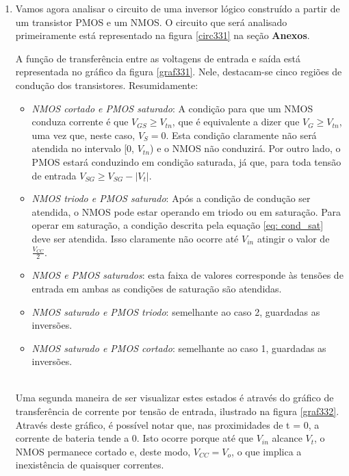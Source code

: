 \documentclass[12pt, a4paper]{article}
\begin{document}
\begin{enumerate}
    \item Vamos agora analisar o circuito de uma inversor lógico construído a partir de um transistor PMOS e um NMOS. O circuito que será analisado primeiramente está representado na figura \ref{circ331} na seção \textbf{Anexos}.
    
    A função de transferência entre as voltagens de entrada e saída está representada no gráfico da figura \ref{graf331}. Nele, destacam-se cinco regiões de condução dos transistores. Resumidamente:
    
        \begin{itemize}
            
            \item \textit{NMOS cortado e PMOS saturado}: A condição para que um NMOS conduza corrente é que \(V_{GS} \geq V_{tn} \), que é equivalente a dizer que \(V_{G} \geq V_{tn} \), uma vez que, neste caso, \(V_S = 0\). Esta condição claramente não será atendida no intervalo [0, \(V_{tn}\)) e o NMOS não conduzirá. Por outro lado, o PMOS estará conduzindo em condição saturada, já que, para toda tensão de entrada \(V_{SG} \geq V_{SG} - |V_t|\).
            
            \item \textit{NMOS triodo e PMOS saturado}: Após a condição de condução ser atendida, o NMOS pode estar operando em triodo ou em saturação. Para operar em saturação, a condição descrita pela equação \ref{eq: cond_sat} deve ser atendida. Isso claramente não ocorre até \(V_{in}\) atingir o valor de \(\frac{V_{CC}}{2}\).
            
            \item \textit{NMOS e PMOS saturados}: esta faixa de valores corresponde às tensões de entrada em ambas as condições de saturação são atendidas.
            
           \item \textit{NMOS saturado e PMOS triodo}: semelhante ao caso 2, guardadas as inversões.
            
            \item \textit{NMOS saturado e PMOS cortado}:  semelhante ao caso 1, guardadas as inversões.
        \end{itemize}
        
            \\
            Uma segunda maneira de ser visualizar estes estados é através do gráfico de transferência de corrente por tensão de entrada, ilustrado na figura \ref{graf332}. Através deste gráfico, é possível notar que, nas proximidades de t = 0, a corrente de bateria tende a 0. Isto ocorre porque até que \(V_{in}\) alcance \(V_t\), o NMOS permanece cortado e, deste modo, \(V_{CC} = V_o\), o que implica a inexistência de quaisquer correntes.
            \\
            

\end{enumerate}
\end{document}
